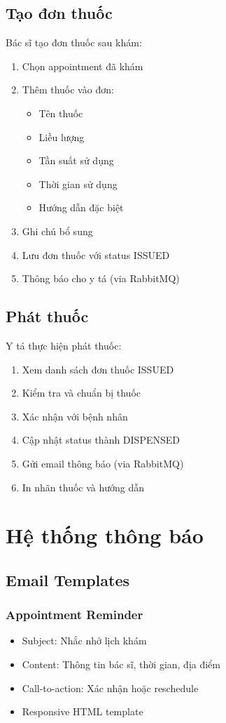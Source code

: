 \documentclass[12pt,a4paper]{report}
\begin{document}
\subsection{Tạo đơn thuốc}
Bác sĩ tạo đơn thuốc sau khám:
\begin{enumerate}
    \item Chọn appointment đã khám
    \item Thêm thuốc vào đơn:
        \begin{itemize}
            \item Tên thuốc
            \item Liều lượng
            \item Tần suất sử dụng
            \item Thời gian sử dụng
            \item Hướng dẫn đặc biệt
        \end{itemize}
    \item Ghi chú bổ sung
    \item Lưu đơn thuốc với status ISSUED
    \item Thông báo cho y tá (via RabbitMQ)
\end{enumerate}

\subsection{Phát thuốc}
Y tá thực hiện phát thuốc:
\begin{enumerate}
    \item Xem danh sách đơn thuốc ISSUED
    \item Kiểm tra và chuẩn bị thuốc
    \item Xác nhận với bệnh nhân
    \item Cập nhật status thành DISPENSED
    \item Gửi email thông báo (via RabbitMQ)
    \item In nhãn thuốc và hướng dẫn
\end{enumerate}

\section{Hệ thống thông báo}

\subsection{Email Templates}
\subsubsection{Appointment Reminder}
\begin{itemize}
    \item Subject: Nhắc nhở lịch khám
    \item Content: Thông tin bác sĩ, thời gian, địa điểm
    \item Call-to-action: Xác nhận hoặc reschedule
    \item Responsive HTML template
\end{itemize}
\end{document}
